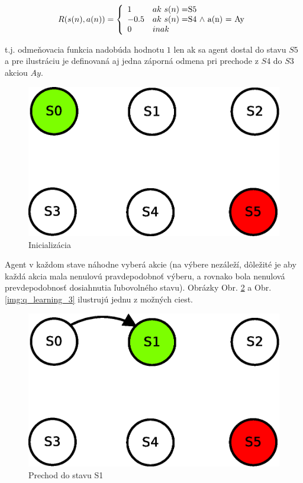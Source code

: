 \begin{equation}
R(s(n), a(n)) =
\left\{
	\begin{array}{ll}
		1  & ak \ s(n) = $S5$ \\
    -0.5  & ak \ s(n) = $S4$ \ \wedge \ $a(n) = Ay$  \\
		0 & inak
	\end{array}
\right.
\label{eq:r_func_simple}
\end{equation}

t.j. odmeňovacia funkcia nadobúda hodnotu $1$ len ak sa agent dostal do stavu
$S5$ a pre ilustráciu je definovaná aj jedna záporná odmena pri prechode z $S4$ do
$S3$ akciou $Ay$.

\begin{figure}[!htb]
\center
\includegraphics[scale=.6]{../diagrams/q_learning_table_01.eps}
\caption{Inicializácia}
\label{img:q_learning_1}
\end{figure}

Agent v každom stave náhodne vyberá akcie (na výbere nezáleží, dôležité je aby
každá akcia mala nenulovú pravdepodobnoť výberu, a rovnako bola nenulová
prevdepodobnosť dosiahnutia ľubovolného stavu). Obrázky Obr. \ref{img:q_learning_2}
a Obr. \ref{img:q_learning_3} ilustrujú jednu z možných ciest.


\begin{figure}[!htb]
\center
\includegraphics[scale=.6]{../diagrams/q_learning_table_02.eps}
\caption{Prechod do stavu S1}
\label{img:q_learning_2}
\end{figure}

